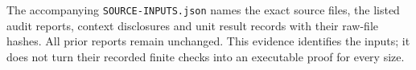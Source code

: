 The accompanying \texttt{SOURCE-INPUTS.json} names the exact source files,
the listed audit reports, context disclosures and unit result records with
their raw-file hashes. All prior reports remain unchanged. This evidence
identifies the inputs; it does not turn their recorded finite checks into
an executable proof for every size.
